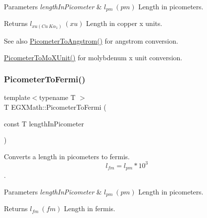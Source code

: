 \begin{DoxyParams}{Parameters}
{\em length\+In\+Picometer} & $ l_{pm}\ (pm)$ Length in picometers. \\
\hline
\end{DoxyParams}
\begin{DoxyReturn}{Returns}
$ l_{xu(Cu\ K\alpha_1)}\ (xu)$ Length in copper x units. 
\end{DoxyReturn}
\begin{DoxySeeAlso}{See also}
\mbox{\hyperlink{group___e_g_x_math-_conversions-_length_conversions-_s_i-_picometer-_non-_s_i_ga0b1b4a3ec4ea0110477f4547025d2719}{Picometer\+To\+Angstrom()}} for angstrom conversion. 

\mbox{\hyperlink{group___e_g_x_math-_conversions-_length_conversions-_s_i-_picometer-_non-_s_i_ga51b96b4bb30b7e9c971db81ff89a82f8}{Picometer\+To\+Mo\+X\+Unit()}} for molybdenum x unit conversion. 
\end{DoxySeeAlso}
\mbox{\label{group___e_g_x_math-_conversions-_length_conversions-_s_i-_picometer-_non-_s_i_ga13ec47b0b50eca30313bb7902a28f0c9}} 
\subsubsection{\texorpdfstring{Picometer\+To\+Fermi()}{PicometerToFermi()}}
{\footnotesize\ttfamily template$<$typename T $>$ \\
T E\+G\+X\+Math\+::\+Picometer\+To\+Fermi (\begin{DoxyParamCaption}\item[{const T}]{length\+In\+Picometer }\end{DoxyParamCaption})}



Converts a length in picometers to fermis. \[ l_{fm}=l_{pm} * 10^{3} \]. 


\begin{DoxyParams}{Parameters}
{\em length\+In\+Picometer} & $ l_{pm}\ (pm)$ Length in picometers. \\
\hline
\end{DoxyParams}
\begin{DoxyReturn}{Returns}
$ l_{fm}\ (fm)$ Length in fermis. 
\end{DoxyReturn}
\mbox{\label{group___e_g_x_math-_conversions-_length_conversions-_s_i-_picometer-_non-_s_i_gad8fddabe74b111596888c370081f725e}} 
